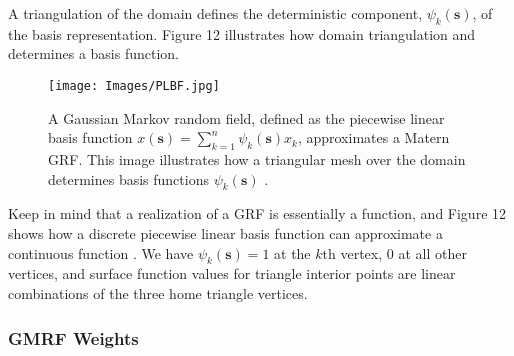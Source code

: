 \documentclass{article}
\begin{document}
A triangulation of the domain defines the deterministic component, $\psi_{k}(\pmb{s})$, of the basis representation. Figure 12 \citep{Simpson2012} illustrates how domain triangulation and determines a basis function.

  \begin{figure}[H]
	\centering 
	\texttt{[image: Images/PLBF.jpg]}
	\caption{A Gaussian Markov random field, defined as the piecewise linear basis function $ x(\pmb{s}) = \sum_{k=1}^{n} \psi_{k}(\pmb{s})x_{k}$, approximates a Matern GRF. This image illustrates how a triangular mesh over the domain determines basis functions $\psi_{k}(\pmb{s})$ \citep{Simpson2012}.}
	\end{figure}
	
Keep in mind that a realization of a GRF is essentially a function, and Figure 12 shows how a discrete piecewise linear basis function can approximate a continuous function \citep{Simpson2012}. We have $\psi_{k}(\pmb{s}) = 1$ at the $k\text{th}$ vertex, $0$ at all other vertices, and surface function values for triangle interior points are linear combinations of the three home triangle vertices.

\subsubsection*{GMRF Weights}
\end{document}
